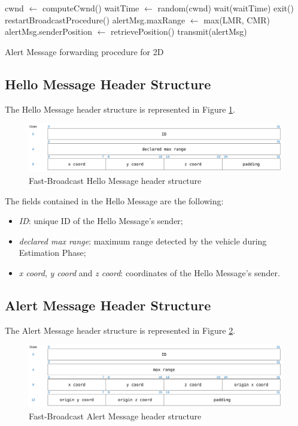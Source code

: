 		\begin{algorithm}[H]
			\begin{algorithmic}[1]
				\State cwnd $\gets$ computeCwnd()
				\State waitTime $\gets$ random(cwnd)
				\State wait(waitTime)
				\State exit()
				\State restartBroadcastProcedure()
				\Else 
				\State alertMsg.maxRange $\gets$ max(LMR, CMR)
				\State alertMsg.senderPosition $\gets$ retrievePosition()
				\State transmit(alertMsg)
				\EndIf 
			\end{algorithmic}
			\caption{Alert Message forwarding procedure for 2D}
			\label{alg:alert-message-forwarding-2d}
		\end{algorithm}
	
		\subsection{Hello Message Header Structure}
			The Hello Message header structure is represented in Figure \ref{fig:fbHelloHeader}.
			\begin{figure}[H]
				\centering
				\includegraphics[width=\textwidth]{immagini/fbHelloHeader}
				\caption{Fast-Broadcast Hello Message header structure}
				\label{fig:fbHelloHeader}
			\end{figure}
			
			The fields contained in the Hello Message are the following:
			\begin{itemize}
				\item \textit{ID}: unique ID of the Hello Message's sender;
				\item \textit{declared max range}: maximum range detected by the vehicle during Estimation Phase;
				\item \textit{x coord}, \textit{y coord} and \textit{z coord}: coordinates of the Hello Message's sender.
			\end{itemize}
		
		\subsection{Alert Message Header Structure}
			The Alert Message header structure is represented in Figure \ref{fig:fbAlertHeader}.
			\begin{figure}[H]
				\centering
				\includegraphics[width=\textwidth]{immagini/fbAlertHeader}
				\caption{Fast-Broadcast Alert Message header structure}
				\label{fig:fbAlertHeader}
			\end{figure}
		
